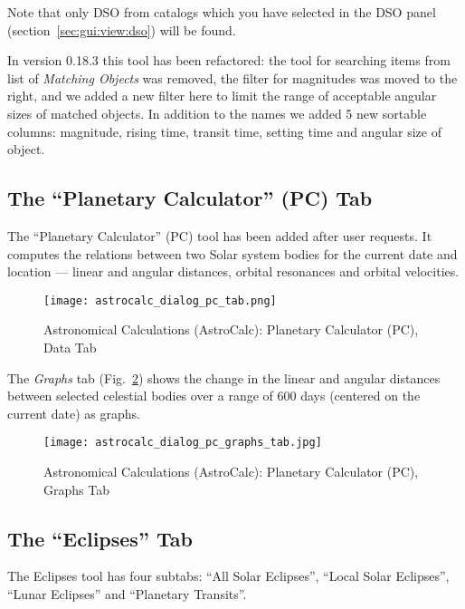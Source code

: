 Note that only DSO from catalogs which you have selected in the DSO panel (section~\ref{sec:gui:view:dso}) will be found.

In version 0.18.3  this tool has been refactored: the tool for searching items from list of \emph{Matching Objects} was removed,
the filter for magnitudes was moved to the right, and we added a new filter here to limit the range of acceptable angular sizes of matched objects.
In addition to the names we added 5 new sortable columns: magnitude, rising time, transit time, setting time and angular size of object.


\subsection{The ``Planetary Calculator'' (PC) Tab}
\label{sec:gui:AstroCalc:PC}

The ``Planetary Calculator'' (PC) tool has been added after user requests. 
It computes the relations between two Solar system bodies for the current date and location --- linear and angular distances, 
orbital resonances and orbital velocities.

\begin{figure}[tbp]
\centering\texttt{[image: astrocalc\_dialog\_pc\_tab.png]}
\caption{Astronomical Calculations (AstroCalc): Planetary Calculator (PC), Data Tab}
\label{fig:gui:AstroCalc:PC:Data}
\end{figure}

The \emph{Graphs} tab  (Fig.~\ref{fig:gui:AstroCalc:PC:Graphs})
shows the change in the linear and angular distances between
selected celestial bodies over a range of 600 days (centered on the
current date) as graphs.

\begin{figure}[tbp]
\centering\texttt{[image: astrocalc\_dialog\_pc\_graphs\_tab.jpg]}
\caption{Astronomical Calculations (AstroCalc): Planetary Calculator (PC), Graphs Tab}
\label{fig:gui:AstroCalc:PC:Graphs}
\end{figure}

\subsection{The ``Eclipses'' Tab}
\label{sec:gui:AstroCalc:Eclipses}

The Eclipses tool has four subtabs: ``All Solar Eclipses'', ``Local Solar Eclipses'', ``Lunar Eclipses'' and ``Planetary Transits''. 

